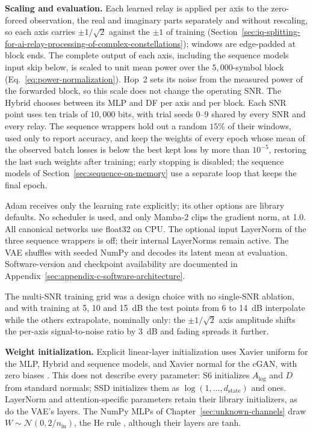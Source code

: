 \textbf{Scaling and evaluation.} Each learned relay is applied per axis to the zero-forced observation, the real and imaginary parts separately and without rescaling, so each axis carries $\pm1/\sqrt{2}$ against the $\pm1$ of training (Section~\ref{sec:iq-splitting-for-ai-relay-processing-of-complex-constellations}); windows are edge-padded at block ends. The complete output of each axis, including the sequence models\textquotesingle{} input skip below, is scaled to unit mean power over the $5{,}000$-symbol block (Eq.~\eqref{eq:power-normalization}). Hop~2 sets its noise from the measured power of the forwarded block, so this scale does not change the operating SNR. The Hybrid chooses between its MLP and DF per axis and per block. Each SNR point uses ten trials of $10{,}000$ bits, with trial seeds 0--9 shared by every SNR and every relay. The sequence wrappers hold out a random $15\%$ of their windows, used only to report accuracy, and keep the weights of every epoch whose mean of the observed batch losses is below the best kept loss by more than $10^{-5}$, restoring the last such weights after training; early stopping is disabled; the sequence models of Section~\ref{sec:sequence-on-memory} use a separate loop that keeps the final epoch.

Adam receives only the learning rate explicitly; its other options are library defaults. No scheduler is used, and only Mamba-2 clips the gradient norm, at 1.0. All canonical networks use float32 on CPU. The optional input LayerNorm of the three sequence wrappers is off; their internal LayerNorms remain active. The VAE shuffles with seeded NumPy and decodes its latent mean at evaluation. Software-version and checkpoint availability are documented in Appendix~\ref{sec:appendix-c-software-architecture}.

The multi-SNR training grid was a design choice with no single-SNR ablation, and with training at 5, 10 and 15~dB the test points from 6 to 14~dB interpolate while the others extrapolate, nominally only: the $\pm1/\sqrt{2}$ axis amplitude shifts the per-axis signal-to-noise ratio by 3~dB and fading spreads it further.

\textbf{Weight initialization.} Explicit linear-layer initialization uses Xavier uniform for the MLP, Hybrid and sequence models, and Xavier normal for the cGAN, with zero biases \cite{GlorotBengio2010Understanding}. This does not describe every parameter: S6 initializes $A_{\log}$ and $D$ from standard normals; SSD initializes them as $\log(1,\ldots,d_{\mathrm{state}})$ and ones. LayerNorm and attention-specific parameters retain their library initializers, as do the VAE's layers. The NumPy MLPs of Chapter~\ref{sec:unknown-channels} draw \(W \sim \mathcal{N}(0,2/n_{\text{in}})\), the He rule \cite{He2015DelvingRectifiers}, although their layers are tanh.

